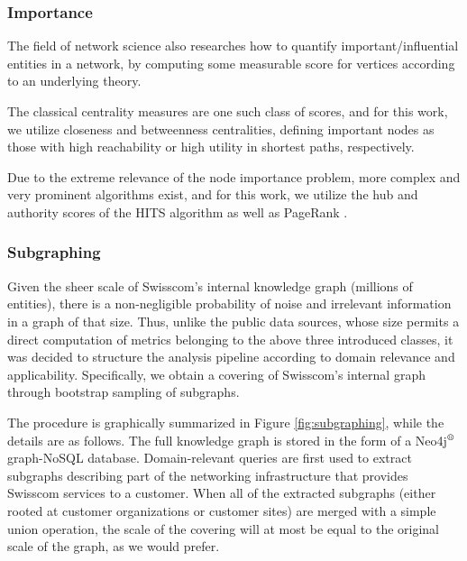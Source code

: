 \subsubsection{Importance}

The field of network science also researches how to quantify important/influential entities in a network, by computing some measurable score for vertices according to an underlying theory.

The classical centrality measures are one such class of scores, and for this work, we utilize closeness and betweenness centralities, defining important nodes as those with high reachability or high utility in shortest paths, respectively.

Due to the extreme relevance of the node importance problem, more complex and very prominent algorithms exist, and for this work, we utilize the hub and authority scores of the HITS algorithm \cite{kleinberg_authoritative_1999} as well as PageRank \cite{brin_anatomy_1998}.

\subsubsection{Subgraphing}

Given the sheer scale of Swisscom's internal knowledge graph (millions of entities), there is a non-negligible probability of noise and irrelevant information in a graph of that size. Thus, unlike the public data sources, whose size permits a direct computation of metrics belonging to the above three introduced classes, it was decided to structure the analysis pipeline according to domain relevance and applicability. Specifically, we obtain a covering of Swisscom's internal graph through bootstrap sampling of subgraphs. 

The procedure is graphically summarized in Figure \ref{fig:subgraphing}, while the details are as follows. The full knowledge graph is stored in the form of a Neo4j$\textsuperscript{\textregistered}$ graph-NoSQL database. Domain-relevant queries are first used to extract subgraphs describing part of the networking infrastructure that provides Swisscom services to a customer. When all of the extracted subgraphs (either rooted at customer organizations or customer sites) are merged with a simple union operation, the scale of the covering will at most be equal to the original scale of the graph, as we would prefer.

